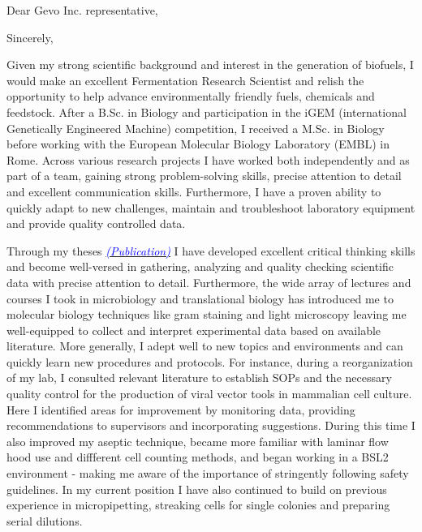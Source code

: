 \documentclass[11pt,a4paper,sans]{moderncv}
\begin{document}
\date{\today}
\opening{Dear Gevo Inc. representative,\vspace{-2mm}}
\closing{Sincerely,\vspace*{-4mm} }
\makelettertitle
\begin{spacing}{1.1}

Given my strong scientific background and interest in the generation of biofuels, I would make an excellent Fermentation Research Scientist and relish the opportunity to help advance environmentally friendly fuels, chemicals and feedstock. After a B.Sc. in Biology and participation in the iGEM (international Genetically Engineered Machine) competition, I received a M.Sc. in Biology before working with the European Molecular Biology Laboratory (EMBL) in Rome. Across various research projects I have worked both independently and as part of a team, gaining strong problem-solving skills, precise attention to detail and excellent communication skills. Furthermore, I have a proven ability to quickly adapt to new challenges, maintain and troubleshoot laboratory equipment and provide quality controlled data.
\par\vspace*{1.5mm}

Through my theses {\href{https://www.ncbi.nlm.nih.gov/pubmed/29517395}{\textcolor{blue}{{\textit{(Publication)}}}}} I have developed excellent critical thinking skills and become well-versed in gathering, analyzing and quality checking scientific data with precise attention to detail. Furthermore, the wide array of lectures and courses I took in microbiology and translational biology has introduced me to molecular biology techniques like gram staining and light microscopy leaving me well-equipped to collect and interpret experimental data based on available literature. More generally, I adept well to new topics and environments and can quickly learn new procedures and protocols. For instance, during a reorganization of my  lab, I consulted relevant literature to establish SOPs and the necessary quality control for the production of viral vector tools in mammalian cell culture. Here I identified areas for improvement by monitoring data, providing recommendations to supervisors and incorporating suggestions. During this time I also improved my aseptic technique, became more familiar with laminar flow hood use and diffferent cell counting methods, and began working in a BSL2 environment - making me aware of the importance of stringently following safety guidelines. In my current position I have also continued to build on previous experience in micropipetting, streaking cells for single colonies and preparing serial dilutions. \par\vspace*{1.5mm}
 

\end{spacing}
\end{document}
